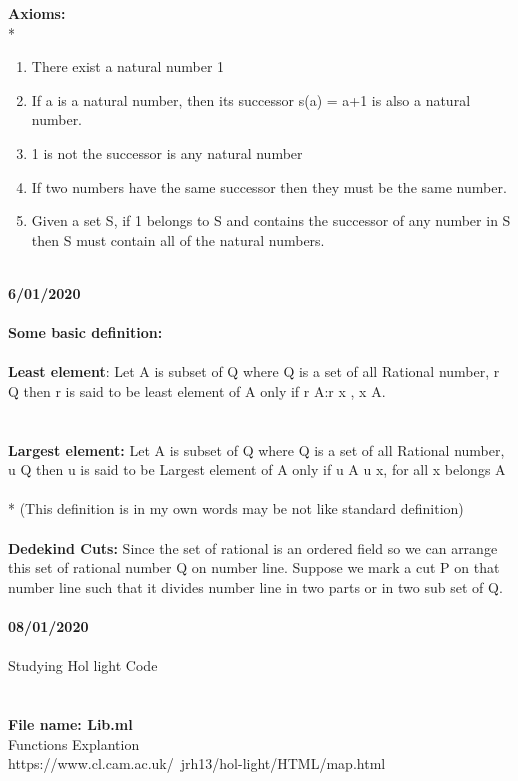 \documentclass{article}
\begin{document}
\textbf{Axioms:}
\\*
\begin{enumerate}
\item There exist a natural number 1
\item If a is a natural number, then its successor  s(a) = a+1 is also a natural number.
\item 1 is not the successor is any natural number
\item If two numbers have the same successor then they must be the same number.
\item Given a set S, if 1 belongs to S and contains the successor of any number in S then S must contain all of the natural numbers.\\
\end{enumerate}
\\
\textbf{6/01/2020}
\\
\\
\textbf{Some basic definition:
}\\
\\
\textbf{Least element}:  Let A is subset of Q where Q is a set of all Rational number, r  Q then r is said to be least element of A only if
r {\in} A:r {\leq x} ,{\forall} x {\in} A. \\   
\\
\\
\textbf{Largest element:}  Let A is subset of Q where Q is a set of all Rational number, u {\in} Q then u is said to be Largest element of A only if
u {\in} A
u {\geq} x, for all x belongs A
\\
\\*
(This definition is in my own words may be not like standard definition)\\
\\
\textbf{Dedekind Cuts:}  Since the set of rational is an ordered field so  we can arrange this set of rational number Q on number line. Suppose we mark a cut P on that number line such that it divides number line in two parts or in two sub set of Q.
\\
\\
\textbf{08/01/2020
}\\
\\
Studying Hol light Code\\
\\
\\
\textbf{File name: Lib.ml}
\\
Functions Explantion\\
https://www.cl.cam.ac.uk/~jrh13/hol-light/HTML/map.html\\
\end{document}
